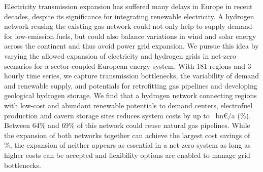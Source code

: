 Electricity transmission expansion has suffered many delays in Europe in recent
decades, despite its significance for integrating renewable electricity. A
hydrogen network reusing the existing gas network could not only help to supply
demand for low-emission fuels, but could also balance variations in wind and
solar energy across the continent and thus avoid power grid expansion. We pursue
this idea by varying the allowed expansion of electricity and hydrogen grids in
net-zero \co scenarios for a sector-coupled European energy system. With 181
regions and 3-hourly time series, we capture transmission bottlenecks, the
variability of demand and renewable supply, and potentials for retrofitting gas
pipelines and developing geological hydrogen storage. We find that a hydrogen
network connecting regions with low-cost and abundant renewable potentials to
demand centers, electrofuel production and cavern storage sites reduces system
costs by up to \maxhybenefitabs~bn\euro/a (\maxhybenefitrel\%). Between 64\% and
69\% of this network could reuse natural gas pipelines. While the expansion of
both networks together can achieve the largest cost savings of
\gridbenefitrel\%, the expansion of neither appears as essential in a net-zero
system as long as higher costs can be accepted and flexibility options are
enabled to manage grid bottlenecks.


